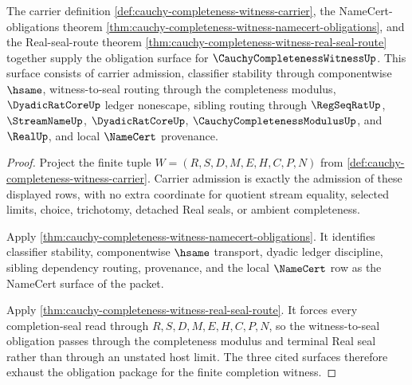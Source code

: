 \begin{theorem}
\label{thm:cauchy-completeness-witness-obligation-package}
The carrier definition \autoref{def:cauchy-completeness-witness-carrier}, the NameCert-obligations theorem \autoref{thm:cauchy-completeness-witness-namecert-obligations}, and the Real-seal-route theorem \autoref{thm:cauchy-completeness-witness-real-seal-route} together supply the obligation surface for $\CauchyCompletenessWitnessUp$. This surface consists of carrier admission, classifier stability through componentwise $\hsame$, witness-to-seal routing through the completeness modulus, $\DyadicRatCoreUp$ ledger nonescape, sibling routing through $\RegSeqRatUp$, $\StreamNameUp$, $\DyadicRatCoreUp$, $\CauchyCompletenessModulusUp$, and $\RealUp$, and local $\NameCert$ provenance.
\end{theorem}
\begin{proof}
Project the finite tuple $W=(R,S,D,M,E,H,C,P,N)$ from \autoref{def:cauchy-completeness-witness-carrier}. Carrier admission is exactly the admission of these displayed rows, with no extra coordinate for quotient stream equality, selected limits, choice, trichotomy, detached Real seals, or ambient completeness.

Apply \autoref{thm:cauchy-completeness-witness-namecert-obligations}. It identifies classifier stability, componentwise $\hsame$ transport, dyadic ledger discipline, sibling dependency routing, provenance, and the local $\NameCert$ row as the NameCert surface of the packet.

Apply \autoref{thm:cauchy-completeness-witness-real-seal-route}. It forces every completion-seal read through $R,S,D,M,E,H,C,P,N$, so the witness-to-seal obligation passes through the completeness modulus and terminal Real seal rather than through an unstated host limit. The three cited surfaces therefore exhaust the obligation package for the finite completion witness.
\end{proof}



